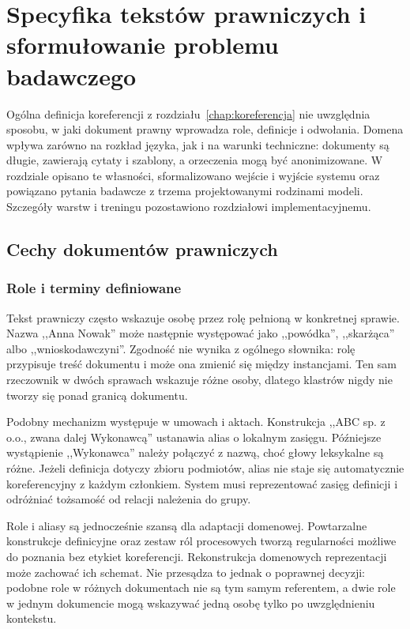 \chapter{Specyfika tekstów prawniczych i sformułowanie problemu badawczego}
\label{chap:prawo}

Ogólna definicja koreferencji z rozdziału~\ref{chap:koreferencja} nie uwzględnia sposobu, w jaki dokument prawny wprowadza role, definicje i odwołania. Domena wpływa zarówno na rozkład języka, jak i na warunki techniczne: dokumenty są długie, zawierają cytaty i szablony, a orzeczenia mogą być anonimizowane. W rozdziale opisano te własności, sformalizowano wejście i wyjście systemu oraz powiązano pytania badawcze z trzema projektowanymi rodzinami modeli. Szczegóły warstw i treningu pozostawiono rozdziałowi implementacyjnemu.

\section{Cechy dokumentów prawniczych}
\label{sec:cechy-prawa}

\subsection{Role i terminy definiowane}

Tekst prawniczy często wskazuje osobę przez rolę pełnioną w konkretnej sprawie. Nazwa ,,Anna Nowak'' może następnie występować jako ,,powódka'', ,,skarżąca'' albo ,,wnioskodawczyni''. Zgodność nie wynika z ogólnego słownika: rolę przypisuje treść dokumentu i może ona zmienić się między instancjami. Ten sam rzeczownik w dwóch sprawach wskazuje różne osoby, dlatego klastrów nigdy nie tworzy się ponad granicą dokumentu.

Podobny mechanizm występuje w umowach i aktach. Konstrukcja ,,ABC sp. z o.o., zwana dalej Wykonawcą'' ustanawia alias o lokalnym zasięgu. Późniejsze wystąpienie ,,Wykonawca'' należy połączyć z nazwą, choć głowy leksykalne są różne. Jeżeli definicja dotyczy zbioru podmiotów, alias nie staje się automatycznie koreferencyjny z każdym członkiem. System musi reprezentować zasięg definicji i odróżniać tożsamość od relacji należenia do grupy.

Role i aliasy są jednocześnie szansą dla adaptacji domenowej. Powtarzalne konstrukcje definicyjne oraz zestaw ról procesowych tworzą regularności możliwe do poznania bez etykiet koreferencji. Rekonstrukcja domenowych reprezentacji może zachować ich schemat. Nie przesądza to jednak o poprawnej decyzji: podobne role w różnych dokumentach nie są tym samym referentem, a dwie role w jednym dokumencie mogą wskazywać jedną osobę tylko po uwzględnieniu kontekstu.


